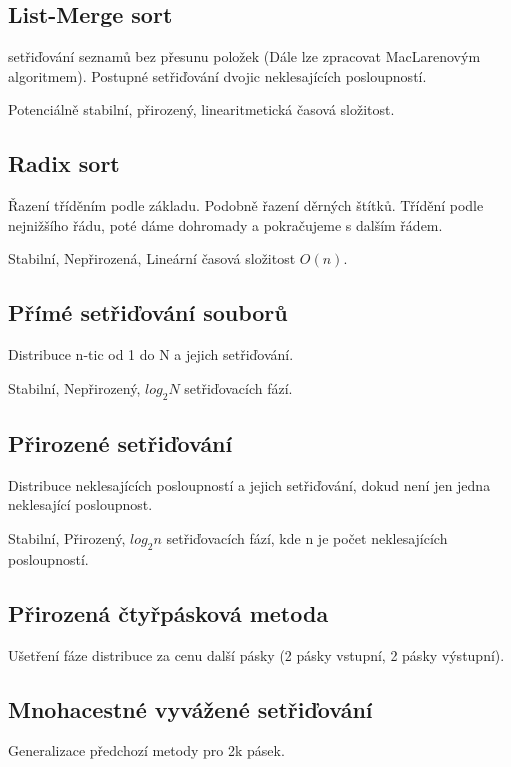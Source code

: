 \documentclass[a4paper, 11pt]{report}
\begin{document}
\subsection{List-Merge sort} setřiďování seznamů bez přesunu položek (Dále lze zpracovat MacLarenovým algoritmem). Postupné setřiďování dvojic neklesajících posloupností.

Potenciálně stabilní, přirozený, linearitmetická časová složitost.

\subsection{Radix sort}

Řazení tříděním podle základu. Podobně řazení děrných štítků. Třídění podle nejnižšího řádu, poté dáme dohromady a pokračujeme s dalším řádem.

Stabilní, Nepřirozená, Lineární časová složitost $O(n)$.

\subsection{Přímé setřiďování souborů}

Distribuce n-tic od 1 do N a jejich setřiďování.

Stabilní, Nepřirozený, $log_2 N$ setřiďovacích fází.

\subsection{Přirozené setřiďování}

Distribuce neklesajících posloupností a jejich setřiďování, dokud není jen jedna neklesající posloupnost.

Stabilní, Přirozený, $log_2 n$ setřiďovacích fází, kde n je počet neklesajících posloupností.

\subsection{Přirozená čtyřpásková metoda}

Ušetření fáze distribuce za cenu další pásky (2 pásky vstupní, 2 pásky výstupní).

\subsection{Mnohacestné vyvážené setřiďování}

Generalizace předchozí metody pro 2k pásek.
\end{document}
